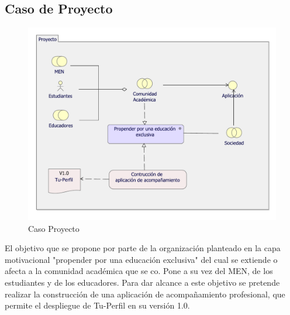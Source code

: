\subsection{Caso  de Proyecto}
\begin{figure}[h!]
	\centering
	\includegraphics[width=.9\linewidth]{imgs/caso/proyecto/proyecto.pdf}
	\caption{Caso Proyecto}
\end{figure}
El objetivo que se propone por parte de la organización planteado en la capa motivacional "propender por una educación exclusiva" del cual se extiende o afecta a la comunidad académica que se co. Pone a su vez del MEN, de los estudiantes y de los educadores. Para dar alcance a este objetivo se pretende realizar la construcción de una aplicación de acompañamiento profesional, que permite el despliegue de Tu-Perfil en su versión 1.0.